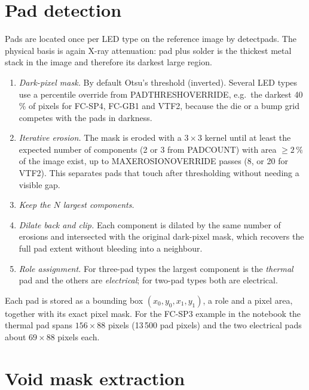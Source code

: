 \documentclass[11pt,a4paper]{article}
\newcommand{\code}[1]{{\ttfamily\def\_{\textunderscore\allowbreak}#1}}
\begin{document}
\section{Pad detection}
\label{sec:pads}

Pads are located once per LED type on the reference image by \code{detect\_pads}. The physical
basis is again X-ray attenuation: pad plus solder is the thickest metal stack in the image and
therefore its darkest large region.

\begin{enumerate}[nosep]
  \item \emph{Dark-pixel mask.} By default Otsu's threshold (inverted). Several LED types use
        a percentile override from \code{PAD\_THRESH\_OVERRIDE}, e.g.\ the darkest 40\,\% of
        pixels for FC-SP4, FC-GB1 and VTF2, because the die or a bump grid competes with the pads
        in darkness.
  \item \emph{Iterative erosion.} The mask is eroded with a $3\times3$ kernel until at least
        the expected number of components (2 or 3 from \code{PAD\_COUNT}) with area
        $\geq 2\,\%$ of the image exist, up to \code{MAX\_EROSION\_OVERRIDE} passes (8, or 20
        for VTF2). This separates pads that touch after thresholding without needing a visible
        gap.
  \item \emph{Keep the $N$ largest components.}
  \item \emph{Dilate back and clip.} Each component is dilated by the same number of erosions
        and intersected with the original dark-pixel mask, which recovers the full pad extent
        without bleeding into a neighbour.
  \item \emph{Role assignment.} For three-pad types the largest component is the
        \emph{thermal} pad and the others are \emph{electrical}; for two-pad types both are
        electrical.
\end{enumerate}

Each pad is stored as a bounding box $(x_0, y_0, x_1, y_1)$, a role and a pixel area, together
with its exact pixel mask. For the FC-SP3 example in the notebook the thermal pad spans
$156\times88$ pixels (13\,500 pad pixels) and the two electrical pads about $69\times88$
pixels each.

\section{Void mask extraction}
\label{sec:voidmask}
\end{document}

